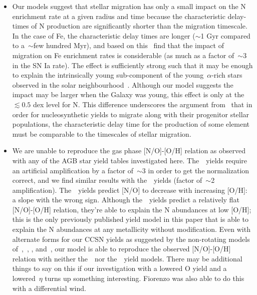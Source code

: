 \documentclass[ms.tex]{subfiles}
\begin{document}
\begin{itemize}
	\item Our models suggest that stellar migration has only a small impact on 
	the N enrichment rate at a given radius and time because the characteristic 
	delay-times of N production are significantly shorter than the migration 
	timescale. 
	In the case of Fe, the characteristic delay times are longer ($\sim$1 Gyr 
	compared to a~$\sim$few hundred Myr), and based on this~\citet{Johnson2021} 
	find that the impact of migration on Fe enrichment rates is considerable 
	(as much as a factor of~$\sim$3 in the SN Ia rate). 
	The effect is sufficiently strong such that it may be enough to explain the 
	intrinsically young sub-component of the young~$\alpha$-rich stars observed 
	in the solar neighbourhood~\citep{Chiappini2015, Martig2015, Martig2016, 
	Jofre2016, Yong2016, Izzard2018, SilvaAguirre2018, Warfield2021}. 
	Although our model suggests the impact may be larger when the Galaxy was 
	young, this effect is only at the~$\lesssim0.5$ dex level for N. 
	This difference underscores the argument from~\citet{Johnson2021} that in 
	order for nucleosynthetic yields to migrate along with their progenitor 
	stellar populations, the characteristic delay time for the production of 
	some element must be comparable to the timescales of stellar migration. 

	\item We are unable to reproduce the gas phase [N/O]-[O/H] relation 
	as observed with any of the AGB star yield tables investigated here. 
	The~\cristallo~yields require an artificial amplification by a factor 
	of~$\sim$3 in order to get the normalization correct, and we find similar 
	results with the~\ventura~yields (factor of~$\sim$2 amplification). 
	The~\karakasten~yields predict [N/O] to decrease with increasing [O/H]: a 
	slope with the wrong sign. 
	Although the~\karakas~yields predict a relatively flat [N/O]-[O/H] 
	relation, they're able to explain the N abundances at low [O/H]; this is 
	the only previously published yield model in this paper that is able to 
	explain the N abundances at any metallicity without modification. 
	Even with alternate forms for our CCSN yields as suggested by the 
	non-rotating models of~\citet{Woosley1995},~\citet{Nomoto2013}, 
	\citet{Sukhbold2016}, and~\citet{Limongi2018}, our model is able to 
	reproduce the observed [N/O]-[O/H] relation with neither 
	the~\karakasten~nor the~\karakas~yield models. 
	{\color{red} 
	There may be additional things to say on this if our investigation with 
	a lowered O yield and a lowered~$\eta$ turns up something interesting. 
	Fiorenzo was also able to do this with a differential wind. 
	}


\end{itemize}
\end{document}
